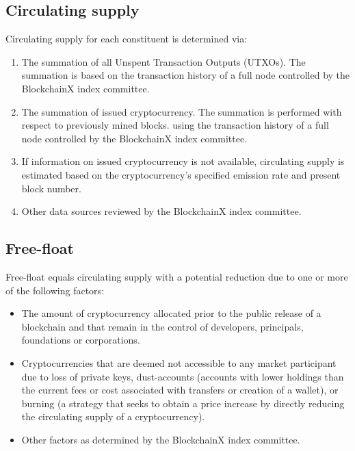\documentclass{article}
\begin{document}
\subsection{Circulating supply}\label{circulating-supply}

Circulating supply for each constituent is determined via:

\begin{enumerate}
\def\labelenumi{\arabic{enumi}.}
\item
  The summation of all Unspent Transaction Outputs (UTXOs). The
  summation is based on the transaction history of a full node
  controlled by the BlockchainX index committee.
\item
  The summation of issued cryptocurrency. The summation is performed
  with respect to previously mined blocks. using the transaction history
  of a full node controlled by the BlockchainX index committee.
\item
  If information on issued cryptocurrency is not available, circulating
  supply is estimated based on the cryptocurrency's specified emission
  rate and present block number.
\item
  Other data sources reviewed by the BlockchainX index committee.
\end{enumerate}

\subsection{Free-float}\label{free-float}

Free-float equals circulating supply with a potential reduction due to
one or more of the following factors:

\begin{itemize}
\item
  The amount of cryptocurrency allocated prior to the public release of
  a blockchain and that remain in the control of developers, principals,
  foundations or corporations.
\item
  Cryptocurrencies that are deemed not accessible to any market
  participant due to loss of private keys, dust-accounts (accounts with
  lower holdings than the current fees or cost associated with transfers
  or creation of a wallet), or burning (a strategy that seeks to obtain
  a price increase by directly reducing the circulating supply of a
  cryptocurrency).
\item
  Other factors as determined by the BlockchainX index committee.
\end{itemize}
\end{document}
